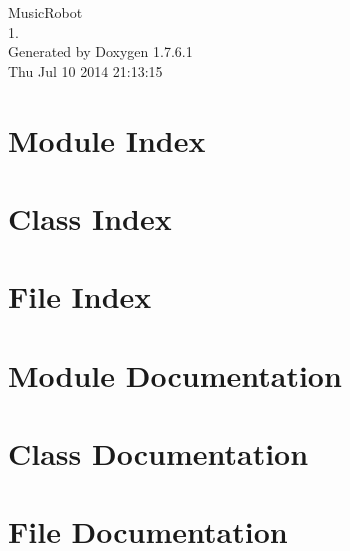 \documentclass[a4paper]{book}
\begin{document}
\hypersetup{pageanchor=false,citecolor=blue}
\begin{titlepage}
\vspace*{7cm}
\begin{center}
{\Large \-Music\-Robot \\[1ex]\large 1. }\\
\vspace*{1cm}
{\large \-Generated by Doxygen 1.7.6.1}\\
\vspace*{0.5cm}
{\small Thu Jul 10 2014 21:13:15}\\
\end{center}
\end{titlepage}
\clearemptydoublepage
{}
\tableofcontents
\clearemptydoublepage
{}
\hypersetup{pageanchor=true,citecolor=blue}
\chapter{\-Module \-Index}

\chapter{\-Class \-Index}

\chapter{\-File \-Index}

\chapter{\-Module \-Documentation}



\chapter{\-Class \-Documentation}














\chapter{\-File \-Documentation}














\printindex
\end{document}
